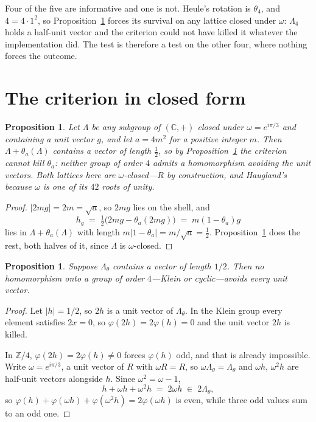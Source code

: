 \documentclass[11pt,reqno]{amsart}
\theoremstyle{plain}
\newtheorem{proposition}[theorem]{Proposition}
\theoremstyle{definition}
\newcommand{\Z}{\mathbb{Z}}
\newcommand{\C}{\mathbb{C}}
\newcommand{\Lat}{R}
\newcommand{\Lam}{\Lambda}
\begin{document}
Four of the five are informative and one is not. Heule's rotation is
$\theta_4$, and $4 = 4\cdot1^2$, so Proposition~\ref{prop:free} forces its
survival on any lattice closed under $\omega$: $\Lam_4$ holds a half-unit vector
and the criterion could not have killed it whatever the implementation did. The
test is therefore a test on the other four, where nothing forces the outcome.


\section{The criterion in closed form}\label{sec:closed}

\begin{proposition}\label{prop:free}
Let $\Lam$ be any subgroup of $(\C,+)$ closed under $\omega = e^{i\pi/3}$ and
containing a unit vector $g$, and let $a = 4m^2$ for a positive integer $m$. Then
$\Lam + \theta_a(\Lam)$ contains a vector of length $\tfrac12$, so by
Proposition~\ref{prop:half} the criterion cannot kill $\theta_a$: neither group
of order $4$ admits a homomorphism avoiding the unit vectors. Both lattices here
are $\omega$-closed---$\Lat$ by construction, and Haugland's because $\omega$ is
one of its $42$ roots of unity.
\end{proposition}

\begin{proof}
$\lvert 2mg\rvert = 2m = \sqrt a$, so $2mg$ lies on the shell, and
\[
  h_g \;=\; \tfrac12\bigl(2mg - \theta_a(2mg)\bigr) \;=\; m(1-\theta_a)g
\]
lies in $\Lam + \theta_a(\Lam)$ with length $m \lvert 1-\theta_a\rvert =
m/\sqrt a = \tfrac12$. Proposition~\ref{prop:half} does the rest, both halves of
it, since $\Lam$ is $\omega$-closed.
\end{proof}

\begin{proposition}\label{prop:half}
Suppose $\Lam_\theta$ contains a vector of length $1/2$. Then no homomorphism
onto a group of order $4$---Klein or cyclic---avoids every unit vector.
\end{proposition}

\begin{proof}
Let $\lvert h \rvert = 1/2$, so $2h$ is a unit vector of $\Lam_\theta$. In the
Klein group every element satisfies $2x = 0$, so $\varphi(2h) = 2\varphi(h) = 0$
and the unit vector $2h$ is killed.

In $\Z/4$, $\varphi(2h) = 2\varphi(h) \ne 0$ forces $\varphi(h)$ odd, and that is
already impossible. Write $\omega = e^{i\pi/3}$, a unit vector of $\Lat$ with
$\omega\Lat = \Lat$, so $\omega\Lam_\theta = \Lam_\theta$ and $\omega h$,
$\omega^2 h$ are half-unit vectors alongside $h$. Since $\omega^2 = \omega - 1$,
\[
  h + \omega h + \omega^2 h \;=\; 2\omega h \;\in\; 2\Lam_\theta ,
\]
so $\varphi(h) + \varphi(\omega h) + \varphi(\omega^2 h) = 2\varphi(\omega h)$ is
even, while three odd values sum to an odd one.
\end{proof}
\end{document}
